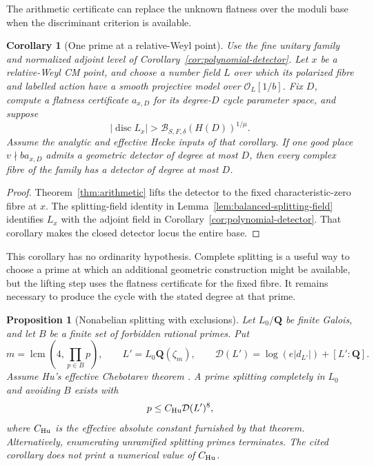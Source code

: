 \documentclass[11pt]{article}
\newtheorem{proposition}[theorem]{Proposition}
\newtheorem{corollary}[theorem]{Corollary}
\theoremstyle{definition}
\theoremstyle{remark}
\begin{document}
The arithmetic certificate can replace the unknown flatness over
the moduli base when the discriminant criterion is available.

\begin{corollary}[One prime at a relative-Weyl point]
\label{cor:combined-oneprime}
Use the fine unitary family and normalized adjoint level of
Corollary~\ref{cor:polynomial-detector}.  Let $x$ be a
relative-Weyl CM point, and choose a number field $L$ over which
its polarized fibre and labelled action have a smooth projective
model over $\mathcal O_L[1/b]$.  Fix $D$, compute a flatness
certificate $a_{x,D}$ for its degree-$D$ cycle parameter space,
and suppose
\[
 |\operatorname{disc}L_x|>
 \mathcal B_{S,F,\delta}(H(D))^{1/\mu}.
\]
Assume the analytic and effective Hecke inputs of that corollary.
If one good place $v\nmid ba_{x,D}$ admits a geometric detector
of degree at most $D$, then every complex fibre of the family
has a detector of degree at most $D$.
\end{corollary}

\begin{proof}
Theorem~\ref{thm:arithmetic} lifts the detector to the fixed
characteristic-zero fibre at $x$.  The splitting-field identity
in Lemma~\ref{lem:balanced-splitting-field} identifies $L_x$ with
the adjoint field in Corollary~\ref{cor:polynomial-detector}.
That corollary makes the closed detector locus the entire base.
\end{proof}

This corollary has no ordinarity hypothesis.  Complete splitting
is a useful way to choose a prime at which an additional geometric
construction might be available, but the lifting step uses the
flatness certificate for the fixed fibre.  It remains necessary to
produce the cycle with the stated degree at that prime.

\begin{proposition}[Nonabelian splitting with exclusions]
\label{prop:hu-exclusions}
Let $L_0/\mathbf Q$ be finite Galois, and let $B$ be a finite set
of forbidden rational primes.  Put
\[
 m=\operatorname{lcm}\left(4,\prod_{p\in B}p\right),\qquad
 L'=L_0\mathbf Q(\zeta_m),\qquad
 \mathcal D(L')=\log(e|d_{L'}|)+[L':\mathbf Q].
\]
Assume Hu's effective Chebotarev theorem
\cite[Corollary~9.6, pp.~56--57]{Hu}.  A prime splitting
completely in $L_0$ and avoiding $B$ exists with
\[
 p\leq C_{\rm Hu}\mathcal D(L')^8,
\]
where $C_{\rm Hu}$ is the effective absolute constant furnished
by that theorem.  Alternatively, enumerating unramified splitting
primes terminates.  The cited corollary does not print a numerical
value of $C_{\rm Hu}$.
\end{proposition}
\end{document}
